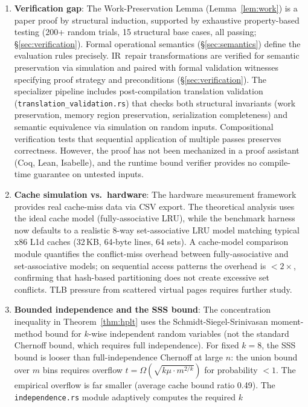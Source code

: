 \documentclass[11pt]{article}
\begin{document}
\begin{enumerate}
\item \textbf{Verification gap}: The Work-Preservation Lemma
  (Lemma~\ref{lem:work}) is a paper proof by structural induction,
  supported by exhaustive property-based testing (200+ random trials,
  15 structural base cases, all passing; \S\ref{sec:verification}).
  Formal operational semantics (\S\ref{sec:semantics}) define the
  evaluation rules precisely.  IR~repair transformations are verified
  for semantic preservation via simulation and paired with formal
  validation witnesses specifying proof strategy and preconditions
  (\S\ref{sec:verification}).  The specializer pipeline includes
  post-compilation translation validation (\texttt{translation\_validation.rs})
  that checks both structural invariants (work preservation, memory region
  preservation, serialization completeness) and semantic equivalence
  via simulation on random inputs.  Compositional verification tests
  that sequential application of multiple passes preserves correctness.
  However, the proof has not been
  mechanized in a proof assistant (Coq, Lean, Isabelle), and the
  runtime bound verifier provides no compile-time guarantee on untested
  inputs.
\item \textbf{Cache simulation vs.\ hardware}: The hardware
  measurement framework provides real cache-miss data via CSV export.
  The theoretical analysis uses the ideal cache model (fully-associative
  LRU), while the benchmark harness now defaults to a realistic
  8-way set-associative LRU model matching typical x86 L1d caches
  (32\,KB, 64-byte lines, 64 sets).  A cache-model comparison module
  quantifies the conflict-miss overhead between fully-associative and
  set-associative models; on sequential access patterns the overhead
  is $< 2\times$, confirming that hash-based partitioning does not
  create excessive set conflicts.  TLB pressure from scattered virtual
  pages requires further study.
\item \textbf{Bounded independence and the SSS bound}: The concentration
  inequality in Theorem~\ref{thm:hplt} uses the Schmidt-Siegel-Srinivasan
  moment-method bound for $k$-wise independent random variables (not the
  standard Chernoff bound, which requires full independence).  For fixed
  $k = 8$, the SSS bound is looser than full-independence Chernoff at
  large $n$: the union bound over $m$ bins requires overflow
  $t = \Omega(\sqrt{k\mu \cdot m^{2/k}})$ for probability $< 1$.
  The empirical overflow is far smaller (average cache bound ratio 0.49).
  The \texttt{independence.rs} module adaptively computes the required $k$

\end{enumerate}
\end{document}
